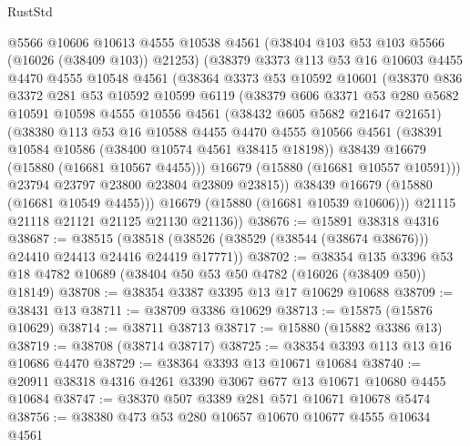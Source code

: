 \begin{lexlean}{RustStd}
\begin{coremodule}
          @5566
          @10606
          @10613
          @4555
          @10538
          @4561
          (@38404 @103 @53 @103 @5566 (@16026 (@38409 @103)) @21253)
          (@38379
            @3373
            @113
            @53
            @16
            @10603
            @4455
            @4470
            @4555
            @10548
            @4561
            (@38364
              @3373
              @53
              @10592
              @10601
              (@38370
                @836
                @3372
                @281
                @53
                @10592
                @10599
                @6119
                (@38379
                  @606
                  @3371
                  @53
                  @280
                  @5682
                  @10591
                  @10598
                  @4555
                  @10556
                  @4561
                  (@38432 @605 @5682 @21647 @21651)
                  (@38380
                    @113
                    @53
                    @16
                    @10588
                    @4455
                    @4470
                    @4555
                    @10566
                    @4561
                    (@38391 @10584 @10586 (@38400 @10574 @4561 @38415 @18198))
                    @38439
                    @16679
                    (@15880 (@16681 @10567 @4455)))
                  @16679
                  (@15880 (@16681 @10557 @10591)))
                @23794
                @23797
                @23800
                @23804
                @23809
                @23815))
            @38439
            @16679
            (@15880 (@16681 @10549 @4455)))
          @16679
          (@15880 (@16681 @10539 @10606)))
        @21115
        @21118
        @21121
        @21125
        @21130
        @21136))
@38676 := @15891 @38318 @4316
@38687 := @38515
    (@38518 (@38526 (@38529 (@38544 (@38674 @38676))) @24410 @24413 @24416 @24419 @17771))
@38702 := @38354
    @135
    @3396
    @53
    @18
    @4782
    @10689
    (@38404 @50 @53 @50 @4782 (@16026 (@38409 @50)) @18149)
@38708 := @38354 @3387 @3395 @13 @17 @10629 @10688
@38709 := @38431 @13
@38711 := @38709 @3386 @10629
@38713 := @15875 (@15876 @10629)
@38714 := @38711 @38713
@38717 := @15880 (@15882 @3386 @13)
@38719 := @38708 (@38714 @38717)
@38725 := @38354 @3393 @113 @13 @16 @10686 @4470
@38729 := @38364 @3393 @13 @10671 @10684
@38740 := @20911 @38318 @4316 @4261 @3390 @3067 @677 @13 @10671 @10680 @4455 @10684
@38747 := @38370 @507 @3389 @281 @571 @10671 @10678 @5474
@38756 := @38380 @473 @53 @280 @10657 @10670 @10677 @4555 @10634 @4561

\end{coremodule}
\end{lexlean}
